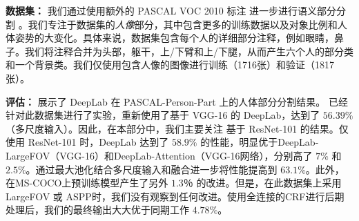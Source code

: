\begin{table}[!t]
  \centering
  \addtolength{\tabcolsep}{-3pt}
  \caption{与 PASCAL-Person-Part 数据集上其它优质算法的比较。}
  \label{tab:pascal_person_part}
\end{table}

\textbf{数据集：} 我们通过使用额外的 PASCAL VOC 2010 标注 \cite{chen_cvpr14} 进一步进行语义部分分割 \cite{wang2014semantic, wang2015joint}。我们专注于数据集的\textit{人像}部分，其中包含更多的训练数据以及对象比例和人体姿势的大变化。具体来说，数据集包含每个人的详细部分注释，例如眼睛，鼻子。我们将注释合并为头部，躯干，上/下臂和上/下腿，从而产生六个人的部分类和一个背景类。我们仅使用包含人像的图像进行训练（1716张）和验证（1817张）。

\textbf{评估：}  展示了 DeepLab 在 PASCAL-Person-Part 上的人体部分分割结果。\cite{chen2015attention} 已经针对此数据集进行了实验，重新使用了基于 VGG-16 的 DeepLab，达到了 $56.39\%$ （多尺度输入）。因此，在本部分中，我们主要关注 基于 ResNet-101 的结果。仅使用 ResNet-101 时，DeepLab 达到了 $58.9\%$ 的性能，明显优于DeepLab-LargeFOV（VGG-16）和DeepLab-Attention（VGG-16网络），分别高了 $7\%$ 和 $2.5\%$。通过最大池化结合多尺度输入和融合进一步将性能提高到 $63.1\%$。此外，在MS-COCO上预训练模型产生了另外 $1.3％$ 的改进。但是，在此数据集上采用LargeFOV 或 ASPP时，我们没有观察到任何改进。使用全连接的CRF进行后期处理后，我们的最终输出大大优于同期工作 \cite{liang2016semantic} $4.78\%$。

